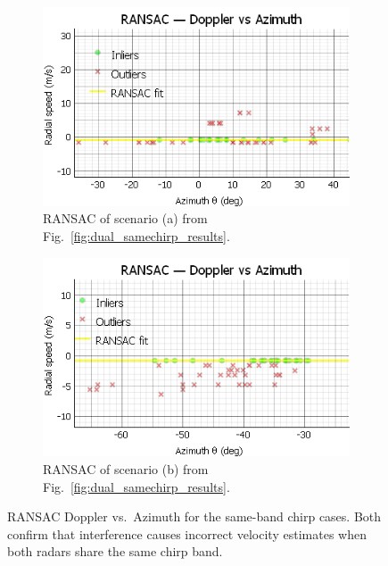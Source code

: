 \begin{figure}[!htbp]
    \centering
    \begin{subfigure}{0.48\linewidth}
        \includegraphics[width=\linewidth]{images/DualSensorSameConfigRansac.png}
        \caption{RANSAC of scenario (a) from Fig.~\ref{fig:dual_samechirp_results}.}
        \label{fig:dual_samechirp_ransac_vehicle}
    \end{subfigure}
    \hfill
    \begin{subfigure}{0.48\linewidth}
        \includegraphics[width=\linewidth]{images/DualSensorSameConfigPersonRansac.png}
        \caption{RANSAC of scenario (b) from Fig.~\ref{fig:dual_samechirp_results}.}
        \label{fig:dual_samechirp_ransac_person}
    \end{subfigure}
    \caption{RANSAC Doppler vs.\ Azimuth for the same-band chirp cases.  
    Both confirm that interference causes incorrect velocity estimates when both radars share the same chirp band.}
    \label{fig:dual_samechirp_ransac}
\end{figure}

